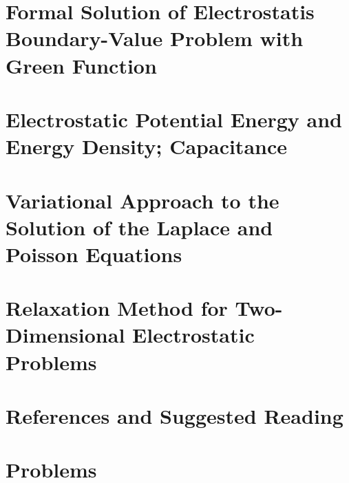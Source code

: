 \section{Formal Solution of Electrostatis Boundary-Value Problem with Green Function}

\section{Electrostatic Potential Energy and Energy Density; Capacitance}

\section{Variational Approach to the Solution of  the Laplace and Poisson Equations}

\section{Relaxation Method for Two-Dimensional Electrostatic Problems} 



\section*{References and Suggested Reading}


\section*{Problems}

